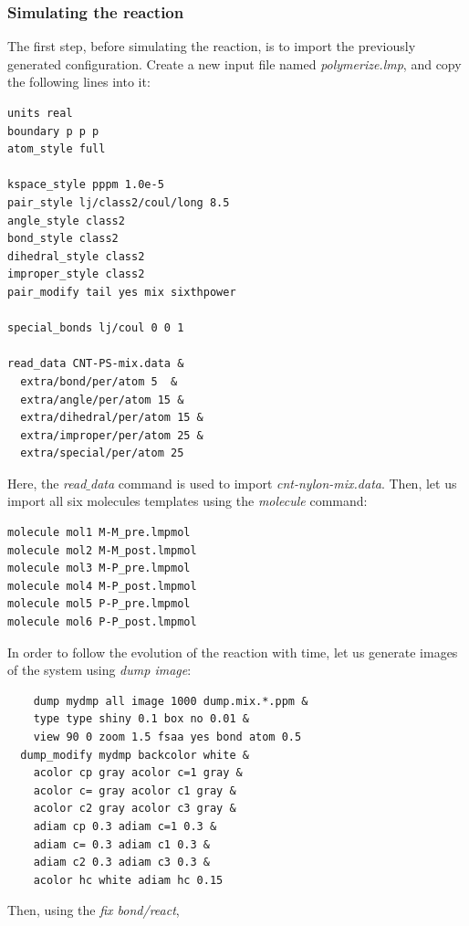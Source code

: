 \documentclass[9pt,tutorial]{livecoms}
\begin{document}

\subsubsection{Simulating the reaction}

The first step, before simulating the reaction, is to import the previously
generated configuration.  Create a new input file named \textit{polymerize.lmp},
and copy the following lines into it:
{\normalsize
\begin{verbatim}
units real
boundary p p p
atom_style full

kspace_style pppm 1.0e-5
pair_style lj/class2/coul/long 8.5
angle_style class2
bond_style class2
dihedral_style class2
improper_style class2
pair_modify tail yes mix sixthpower

special_bonds lj/coul 0 0 1

read_data CNT-PS-mix.data &
  extra/bond/per/atom 5  &
  extra/angle/per/atom 15 &
  extra/dihedral/per/atom 15 &
  extra/improper/per/atom 25 &
  extra/special/per/atom 25
\end{verbatim}
}
Here, the \textit{read$\_$data} command is used to import \textit{cnt-nylon-mix.data}.
Then, let us import all six molecules templates using the \textit{molecule} command:
{\normalsize
\begin{verbatim}
molecule mol1 M-M_pre.lmpmol
molecule mol2 M-M_post.lmpmol
molecule mol3 M-P_pre.lmpmol
molecule mol4 M-P_post.lmpmol
molecule mol5 P-P_pre.lmpmol
molecule mol6 P-P_post.lmpmol
\end{verbatim}
}
In order to follow the evolution of the reaction with time, let us generate images
of the system using \textit{dump image}:
{\normalsize
\begin{verbatim}
    dump mydmp all image 1000 dump.mix.*.ppm &
    type type shiny 0.1 box no 0.01 &
    view 90 0 zoom 1.5 fsaa yes bond atom 0.5
  dump_modify mydmp backcolor white &
    acolor cp gray acolor c=1 gray &
    acolor c= gray acolor c1 gray &
    acolor c2 gray acolor c3 gray &
    adiam cp 0.3 adiam c=1 0.3 &
    adiam c= 0.3 adiam c1 0.3 &
    adiam c2 0.3 adiam c3 0.3 &
    acolor hc white adiam hc 0.15
\end{verbatim}
}
Then, using the \textit{fix bond/react},
\end{document}
